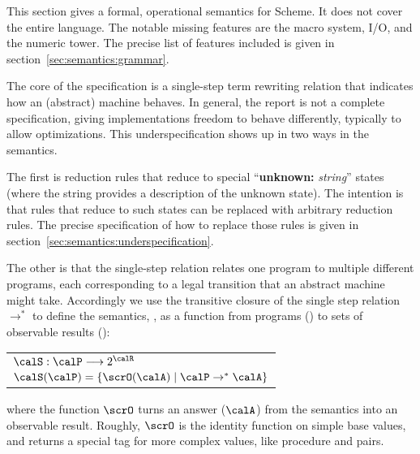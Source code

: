 

This section gives a formal, operational semantics for Scheme. It does not cover the entire language. The notable missing features are the macro system, I/O, and the numeric tower. The precise list of features included is given in section~\ref{sec:semantics:grammar}.

The core of the specification is a single-step term rewriting relation that indicates how an (abstract) machine behaves. In general, the report is not a complete specification, giving implementations freedom to behave differently, typically to allow optimizations. This underspecification shows up in two ways in the semantics. 

The first is reduction rules that reduce to special ``\textbf{unknown:} \textit{string}'' states (where the string provides a description of the unknown state). The intention is that rules that reduce to such states can be replaced with arbitrary reduction rules. The precise specification of how to replace those rules is given in section~\ref{sec:semantics:underspecification}.

The other is that the single-step relation relates one program to
multiple different programs, each corresponding to a legal transition
that an abstract machine might take. Accordingly we use the transitive
closure of the single step relation $\rightarrow^*$ to define the
semantics, \calS, as a function from programs (\calP)
to sets of observable results (\calR):
\begin{center}
\begin{tabular}{l}
$\calS : \calP \longrightarrow 2^{\calR}$ \\
$\calS(\calP) = \{ \scrO(\calA) \mid \calP \rightarrow^* \calA \}$
\end{tabular}
\end{center}
where the function $\scrO$ turns an answer ($\calA$) from the semantics into an observable result. Roughly, $\scrO$ is the identity function on simple base values, and returns a special tag for more complex values, like procedure and pairs.

